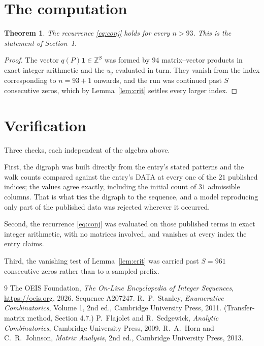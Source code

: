 \documentclass[11pt,a4paper]{article}
\theoremstyle{plain}
\newtheorem{theorem}{Theorem}
\theoremstyle{definition}
\begin{document}
\section{The computation}

\begin{theorem}
The recurrence \eqref{eq:conj} holds for every $n>93$. This is the statement of
Section~1.
\end{theorem}

\begin{proof}
The vector $q(P)\mathbf{1}\in\mathbb{Z}^{S}$ was formed by $94$ matrix--vector
products in exact integer arithmetic and the $u_j$ evaluated in turn. They vanish from the
index corresponding to $n=93+1$ onwards, and the run was continued past $S$ consecutive
zeros, which by Lemma~\ref{lem:crit} settles every larger index.
\end{proof}

\section{Verification}

Three checks, each independent of the algebra above.

First, the digraph was built directly from the entry's stated patterns and the walk counts
compared against the entry's DATA at every one of the $21$ published indices; the
values agree exactly, including the initial count of $31$ admissible columns. That is
what ties the digraph to the sequence, and a model reproducing only part of the published
data was rejected wherever it occurred.

Second, the recurrence \eqref{eq:conj} was evaluated on those published terms in exact
integer arithmetic, with no matrices involved, and vanishes at every index the entry claims.

Third, the vanishing test of Lemma~\ref{lem:crit} was carried past $S=961$ consecutive
zeros rather than to a sampled prefix.

\begin{thebibliography}{9}
 The OEIS Foundation, \emph{The On-Line Encyclopedia of Integer
Sequences}, \url{https://oeis.org}, 2026. Sequence A207247.
 R.~P.~Stanley, \emph{Enumerative Combinatorics}, Volume 1, 2nd ed.,
Cambridge University Press, 2011. (Transfer-matrix method, Section 4.7.)
 P.~Flajolet and R.~Sedgewick, \emph{Analytic Combinatorics}, Cambridge
University Press, 2009.
 R.~A.~Horn and C.~R.~Johnson, \emph{Matrix Analysis}, 2nd ed., Cambridge
University Press, 2013.
\end{thebibliography}
\end{document}
